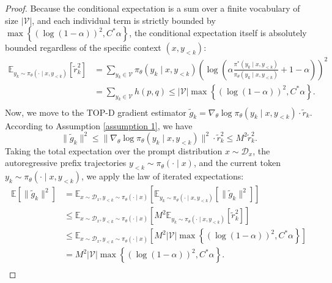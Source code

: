 \documentclass{article}
\theoremstyle{plain}
\theoremstyle{definition}
\theoremstyle{remark}
\begin{document}
\begin{proof}
	Because the conditional expectation is a sum over a finite vocabulary of size $\lvert\mathcal{V}\rvert$, and each individual term is strictly bounded by $\max\left\{\left(\log(1-\alpha)\right)^2, C^*\alpha\right\}$, the conditional expectation itself is absolutely bounded regardless of the specific context $(x, y_{<k})$:
	\begin{equation}
		\begin{split}
			\mathbb{E}_{y_k \sim \pi_\theta(\cdot \mid x, y_{<k})}\left[\tilde{r}_k^2\right] &= \sum_{y_k \in \mathcal{V}} \pi_\theta(y_k \mid x, y_{<k}) \left( \log\left(\alpha \frac{\pi^*(y_k \mid x, y_{<k})}{\pi_\theta(y_k \mid x, y_{<k})} + 1 - \alpha\right) \right)^2\\
			&= \sum_{y_k \in \mathcal{V}} h(p, q) \leq\lvert\mathcal{V}\rvert\max\left\{\left(\log(1-\alpha)\right)^2, C^*\alpha\right\}. \\
		\end{split}
	\end{equation}
	Now, we move to the TOP-D gradient estimator $\tilde{g}_k = \nabla_\theta \log \pi_\theta(y_k \mid x, y_{<k}) \cdot \tilde{r}_k$. According to Assumption \ref{assumption 1}, we have
	\begin{equation}
		\lVert\tilde{g}_k\rVert^2 \leq \lVert\nabla_\theta \log \pi_\theta(y_k \mid x, y_{<k})\rVert^2 \cdot \tilde{r}_k^2 \leq M^2 \tilde{r}_k^2.
	\end{equation}
	Taking the total expectation over the prompt distribution $x \sim \mathcal{D}_x$, the autoregressive prefix trajectories $y_{<k} \sim \pi_\theta(\cdot \mid x)$, and the current token $y_k \sim \pi_\theta(\cdot \mid x, y_{<k})$, we apply the law of iterated expectations:
	\begin{equation}
		\begin{split}
			\mathbb{E}[\lVert\tilde{g}_k\rVert^2] &= \mathbb{E}_{x \sim \mathcal{D}_x, y_{<k} \sim \pi_\theta(\cdot \mid x)} \left[ \mathbb{E}_{y_k \sim \pi_\theta(\cdot \mid x, y_{<k})} \left[ \lVert\tilde{g}_k\rVert^2 \right] \right] \\
			&\leq\mathbb{E}_{x \sim \mathcal{D}_x, y_{<k} \sim \pi_\theta(\cdot \mid x)} \left[ M^2 \mathbb{E}_{y_k \sim \pi_\theta(\cdot \mid x, y_{<k})}\left[\tilde{r}_k^2\right]\right]\\
			&\leq\mathbb{E}_{x \sim \mathcal{D}_x, y_{<k} \sim \pi_\theta(\cdot \mid x)} \left[ M^2 \lvert\mathcal{V}\rvert\max\left\{\left(\log(1-\alpha)\right)^2, C^*\alpha\right\}\right]\\
			&=M^2\lvert\mathcal{V}\rvert\max\left\{\left(\log(1-\alpha)\right)^2, C^*\alpha\right\}.\\

\end{split}
\end{equation}
\end{proof}
\end{document}
